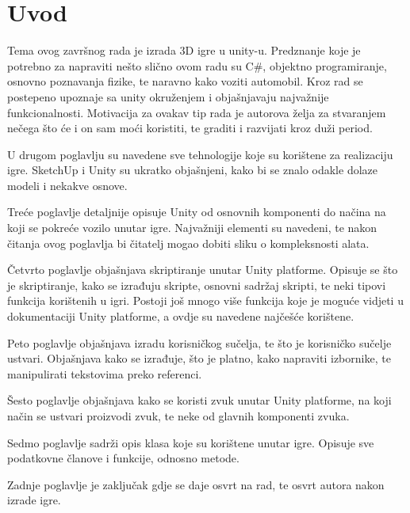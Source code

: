 \section{Uvod}
Tema ovog završnog rada je izrada 3D igre u unity-u. Predznanje koje je potrebno za napraviti nešto slično ovom radu su C\#, objektno programiranje, osnovno poznavanja fizike, te naravno kako voziti automobil. Kroz rad se postepeno upoznaje sa unity okruženjem i objašnjavaju najvažnije funkcionalnosti. Motivacija za ovakav tip rada je autorova želja za stvaranjem nečega što će i on sam moći koristiti, te graditi i razvijati kroz duži period.

U drugom poglavlju su navedene sve tehnologije koje su korištene za realizaciju igre. SketchUp i Unity su ukratko objašnjeni, kako bi se znalo odakle dolaze modeli i nekakve osnove.

Treće poglavlje detaljnije opisuje Unity od osnovnih komponenti do načina na koji se pokreće vozilo unutar igre. Najvažniji elementi su navedeni, te nakon čitanja ovog poglavlja bi čitatelj mogao dobiti sliku o kompleksnosti alata.

Četvrto poglavlje objašnjava skriptiranje unutar Unity platforme. Opisuje se što je skriptiranje, kako se izrađuju skripte, osnovni sadržaj skripti, te neki tipovi funkcija korištenih u igri. Postoji još mnogo više funkcija koje je moguće vidjeti u dokumentaciji Unity platforme, a ovdje su navedene najčešće korištene. 

Peto poglavlje objašnjava izradu korisničkog sučelja, te što je korisničko sučelje ustvari. Objašnjava kako se izrađuje, što je platno, kako napraviti izbornike, te manipulirati tekstovima preko referenci.

Šesto poglavlje objašnjava kako se koristi zvuk unutar Unity platforme, na koji način se ustvari proizvodi zvuk, te neke od glavnih komponenti zvuka. 

Sedmo poglavlje sadrži opis klasa koje su korištene unutar igre. Opisuje sve podatkovne članove i funkcije, odnosno metode.

Zadnje poglavlje je zaključak gdje se daje osvrt na rad, te osvrt autora nakon izrade igre.